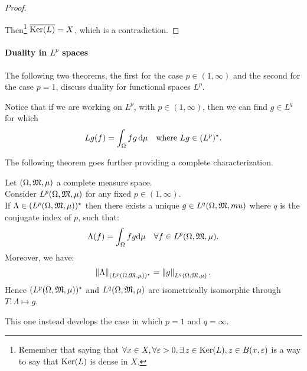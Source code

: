 \begin{proof}
\begin{figure}[htpb]
	\end{figure}
	\FloatBarrier
	Then\footnote{Remember that saying that $\forall x\in X,\forall \varepsilon  >0,\exists \, z\in \operatorname{Ker}(L) ,z\in B( x,\varepsilon )$ is a way to say that $\operatorname{Ker}(L)$ is dense in $X$.} $\overline{\operatorname{Ker}(L)}=X$, which is a contradiction.
\end{proof}


\paragraph{Duality in $L^p$ spaces} The following two theorems, the first for the case $p \in (1, \infty)$ and the second for the case $p=1$, discuss duality for functional spaces $L^p$.

Notice that if we are working on $L^p$, with $p \in (1, \infty)$, then we can find $g \in L^q$ for which
$$
	Lg(f)
	= \int_\Omega f g \, \mathrm d \mu
	\quad \text{where }Lg \in (L^p)^\star
	.
$$

The following theorem goes further providing a complete characterization.

\begin{theo}\label{theo-duality-l-p-1-infinity}
	Let $(\Omega, \mathfrak M, \mu)$ a complete measure space.\\
	Consider $L^p(\Omega, \mathfrak M,\mu)$ for any fixed $p \in (1, \infty)$.\\
	If $\Lambda \in (L^p(\Omega, \mathfrak M, \mu))^\star$ then there exists a unique $g \in L^q(\Omega, \mathfrak M, mu)$ where $q$ is the conjugate index of $p$, such that:
	$$\Lambda (f) = \int_\Omega f g \mathrm d \mu \quad \forall f \in L^p(\Omega, \mathfrak M, \mu).$$
	Moreover, we have:
	$$\left\lVert\Lambda\right\rVert_{(L^p(\Omega, \mathfrak M, \mu))^\star} = \left\lVert g\right\rVert_{L^q(\Omega, \mathfrak M, \mu)}.$$
	Hence $(L^p(\Omega, \mathfrak M, \mu))^\star$ and $L^q(\Omega, \mathfrak M, \mu)$ are isometrically isomorphic through $T: \Lambda \mapsto g$.
\end{theo}

This one instead develops the case in which $p = 1$ and $q = \infty$.

